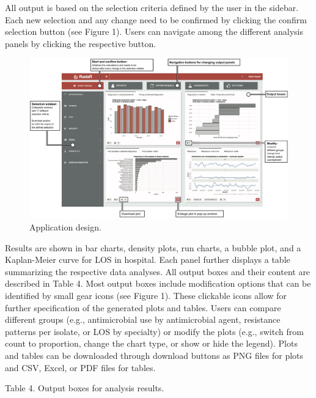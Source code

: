 \documentclass[
]{book}
\begin{document}
All output is based on the selection criteria defined by the user in the sidebar. Each new selection and any change need to be confirmed by clicking the confirm selection button (see Figure 1). Users can navigate among the different analysis panels by clicking the respective button.

\begin{figure}

{\centering \includegraphics[width=1\linewidth]{images/05-01} 

}

\caption{Application design.}\label{fig:fig5-1}
\end{figure}

Results are shown in bar charts, density plots, run charts, a bubble plot, and a Kaplan-Meier curve for LOS in hospital. Each panel further displays a table summarizing the respective data analyses. All output boxes and their content are described in Table 4. Most output boxes include modification options that can be identified by small gear icons (see Figure 1). These clickable icons allow for further specification of the generated plots and tables. Users can compare different groups (e.g., antimicrobial use by antimicrobial agent, resistance patterns per isolate, or LOS by specialty) or modify the plots (e.g., switch from count to proportion, change the chart type, or show or hide the legend). Plots and tables can be downloaded through download buttons as PNG files for plots and CSV, Excel, or PDF files for tables.

Table 4. Output boxes for analysis results.
\end{document}
